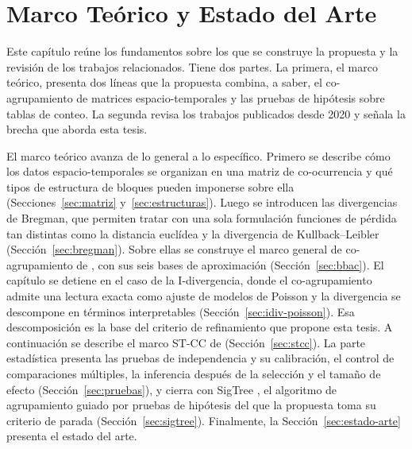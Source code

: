 
\chapter{Marco Teórico y Estado del Arte}\label{chap:marco}

Este capítulo reúne los fundamentos sobre los que se construye la propuesta y la
revisión de los trabajos relacionados. Tiene dos partes. La primera, el marco
teórico, presenta dos líneas que la propuesta combina, a saber, el co-agrupamiento
de matrices espacio-temporales y las pruebas de hipótesis sobre tablas de
conteo. La segunda revisa los trabajos publicados desde 2020 y señala la brecha que aborda
esta tesis.

El marco teórico avanza de lo general a lo específico. Primero se describe cómo
los datos espacio-temporales se organizan en una matriz de co-ocurrencia y qué
tipos de estructura de bloques pueden imponerse sobre ella
(Secciones~\ref{sec:matriz} y~\ref{sec:estructuras}). Luego se introducen las
divergencias de Bregman, que permiten tratar con una sola formulación funciones de
pérdida tan distintas como la distancia euclídea y la divergencia de
Kullback--Leibler (Sección~\ref{sec:bregman}). Sobre ellas se construye el marco
general de co-agrupamiento de \citet{Banerjee2007}, con sus seis bases de
aproximación (Sección~\ref{sec:bbac}). El capítulo se detiene en el caso de la
I-divergencia, donde el co-agrupamiento admite una lectura exacta como ajuste de
modelos de Poisson y la divergencia se descompone en términos interpretables
(Sección~\ref{sec:idiv-poisson}). Esa descomposición es la base del criterio de
refinamiento que propone esta tesis. A continuación se describe el marco ST-CC de
\citet{Liu2021} (Sección~\ref{sec:stcc}). La parte estadística presenta las pruebas
de independencia y su calibración, el control de comparaciones múltiples, la
inferencia después de la selección y el tamaño de efecto
(Sección~\ref{sec:pruebas}), y cierra con SigTree \citep{Hu2025}, el algoritmo de
agrupamiento guiado por pruebas de hipótesis del que la propuesta toma su
criterio de parada (Sección~\ref{sec:sigtree}). Finalmente, la
Sección~\ref{sec:estado-arte} presenta el estado del arte.

